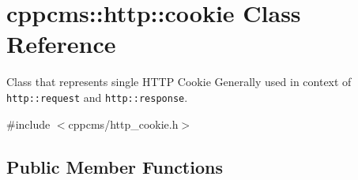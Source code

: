 \section{cppcms\-:\-:http\-:\-:cookie \-Class \-Reference}
\label{classcppcms_1_1http_1_1cookie}


\-Class that represents single \-H\-T\-T\-P \-Cookie \-Generally used in context of {\tt http\-::request} and {\tt http\-::response}.  




{\ttfamily \#include $<$cppcms/http\-\_\-cookie.\-h$>$}

\subsection*{\-Public \-Member \-Functions}
